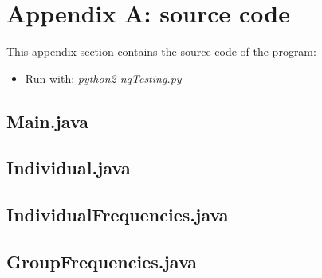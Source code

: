 \documentclass[runningheads]{llncs}
\begin{document}
\section{Appendix A: source code}\label{appendix}
This appendix section contains the source code of the program:
\begin{itemize}
\item Run with: \textit{python2 nqTesting.py}
\end{itemize}

\subsection{Main.java}\label{main}


\subsection{Individual.java}\label{ind}


\subsection{IndividualFrequencies.java}\label{indfre}


\subsection{GroupFrequencies.java}\label{groupfre}


%
\end{document}
